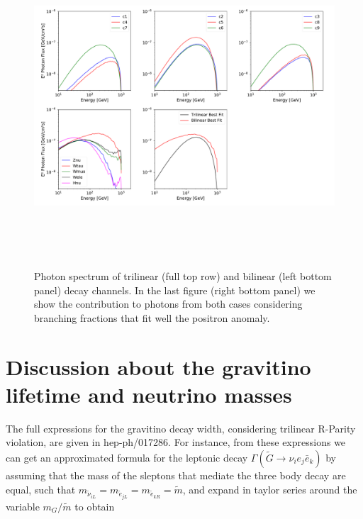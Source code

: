 \documentclass[a4paper,11pt]{article}
\begin{document}
\begin{figure}[htb]
\begin{center}
\includegraphics[height=12cm,width=16cm,angle=0]{Figures/exp_plots_gamma_rays_EGB_comparison.pdf}
\caption{Photon spectrum of trilinear (full top row) and bilinear (left bottom panel) decay channels. In the last figure (right bottom panel) we show the contribution to photons from both cases considering branching fractions that fit well the positron anomaly.}
\label{fig:photon-spectrum}
\end{center}
\end{figure}

\section{Discussion about the gravitino lifetime and neutrino masses}
\label{sec:lifetime-neutrinomasses}

The full expressions for the gravitino decay width, considering trilinear
R-Parity violation, are given in hep-ph/017286. For instance, from
these expressions we can get an approximated formula for the leptonic
decay $\Gamma(\tilde{G}\rightarrow\nu_{i}e_{j}\bar{e}_{k})$ by assuming
that the mass of the sleptons that mediate the three body decay are
equal, such that $m_{\tilde{\nu}_{iL}}=m_{\tilde{e}_{jL}}=m_{\tilde{e}_{kR}}=\tilde{m}$,
and expand in taylor series around the variable $m_{G}/\tilde{m}$
to obtain
\end{document}
